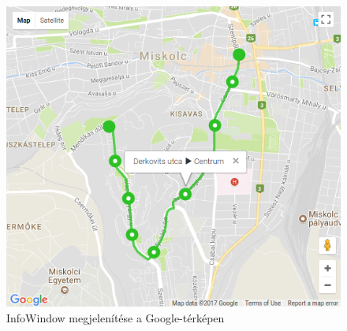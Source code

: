 \begin{figure}[h!]
\centering
\includegraphics[scale=0.7]{kepek/terkep.png}
\caption{InfoWindow megjelenítése a Google-térképen}
\label{fig:terkep}
\end{figure}
